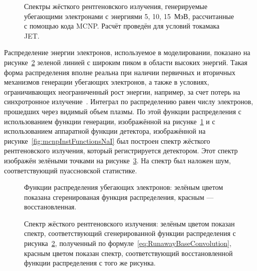 \begin{figure}[ht!]
  \caption{ Спектры жёсткого рентгеновского излучения, генерируемые убегающими электронами с энергиями 5, 10, 15~МэВ, рассчитанные с помощью кода MCNP. Расчёт проведён для условий токамака JET.~\cite{Shevelev2013} }
  \label{fig:mcnpRunawayResponseJetSh2013}
\end{figure}

Распределение энергии электронов, используемое в моделировании, показано на рисунке~\ref{fig:runawayJetSimulationEdfSh2013} зеленой линией с широким пиком в области высоких энергий. Такая форма распределения вполне реальна при наличии первичных и вторичных механизмов генерации убегающих электронов, а также в условиях, ограничивающих неограниченный рост энергии, например, за счет потерь на синхротронное излучение~\cite{MartinSolis1999,Shevelev2013}. Интеграл по  распределению равен числу электронов, прошедших через видимый объем плазмы. По этой функции распределения с использованием функции генерации, изображённой на рисунке~\ref{fig:mcnpRunawayResponseJetSh2013} и с использованием аппаратной функции детектора, изображённой на рисунке~\ref{fig:mcnpInstFunctionsNaI} был построен спектр жёсткого рентгеновского излучения, который регистрируется детектором. Этот спектр изображён зелёными точками на рисунке~\ref{fig:runawayJetSimulationSpectrumSh2013}. На спектр был наложен шум, соответствующий пуассновской статистике.~\cite{Shevelev2013}

\begin{figure}[ht!]
  \caption{ Функции распределения убегающих электронов: зелёным цветом показана сгеренированая функция распределения, красным --- восстановленная.~\cite{Shevelev2013} }
  \label{fig:runawayJetSimulationEdfSh2013}
\end{figure}

\begin{figure}[ht!]
  \caption{ Спектр жёсткого рентгеновского излучения: зелёным цветом показан спектр, соответствующий сгенерированной функции распределения с рисунка~\ref{fig:runawayJetSimulationEdfSh2013}, полученный по формуле~\ref{eq:RunawayBaseConvolution}, красным цветом показан спектр, соответствующий восстановленной функции распределения с того же рисунка.~\cite{Shevelev2013} }
  \label{fig:runawayJetSimulationSpectrumSh2013}
\end{figure}

